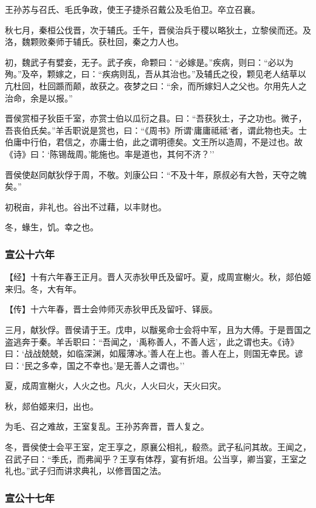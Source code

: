 \documentclass[]{article}
\begin{document}
王孙苏与召氏、毛氏争政，使王子捷杀召戴公及毛伯卫。卒立召襄。

秋七月，秦桓公伐晋，次于辅氏。壬午，晋侯治兵于稷以略狄土，立黎侯而还。及洛，魏颗败秦师于辅氏。获杜回，秦之力人也。

初，魏武子有嬖妾，无子。武子疾，命颗曰：``必嫁是。''疾病，则曰：``必以为殉。''及卒，颗嫁之，曰：``疾病则乱，吾从其治也。''及辅氏之役，颗见老人结草以亢杜回，杜回踬而颠，故获之。夜梦之曰：``余，而所嫁妇人之父也。尔用先人之治命，余是以报。''

晋侯赏桓子狄臣千室，亦赏士伯以瓜衍之县。曰：``吾获狄土，子之功也。微子，吾丧伯氏矣。''羊舌职说是赏也，曰：``《周书》所谓`庸庸祗祗'者，谓此物也夫。士伯庸中行伯，君信之，亦庸士伯，此之谓明德矣。文王所以造周，不是过也。故《诗》曰：`陈锡哉周。'能施也。率是道也，其何不济？''

晋侯使赵同献狄俘于周，不敬。刘康公曰：``不及十年，原叔必有大咎，天夺之魄矣。''

初税亩，非礼也。谷出不过藉，以丰财也。

冬，蝝生，饥。幸之也。

\hypertarget{header-n1481}{%
\subsubsection{宣公十六年}\label{header-n1481}}

【经】十有六年春王正月。晋人灭赤狄甲氏及留吁。夏，成周宣榭火。秋，郯伯姬来归。冬，大有年。

【传】十六年春，晋士会帅师灭赤狄甲氏及留吁、铎辰。

三月，献狄俘。晋侯请于王。戊申，以黻冕命士会将中军，且为大傅。于是晋国之盗逃奔于秦。羊舌职曰：``吾闻之，`禹称善人，不善人远'，此之谓也夫。《诗》曰：`战战兢兢，如临深渊，如履薄冰。'善人在上也。善人在上，则国无幸民。谚曰：`民之多幸，国之不幸也。'是无善人之谓也。''

夏，成周宣榭火，人火之也。凡火，人火曰火，天火曰灾。

秋，郯伯姬来归，出也。

为毛、召之难故，王室复乱。王孙苏奔晋，晋人复之。

冬，晋侯使士会平王室，定王享之，原襄公相礼，殽烝。武子私问其故。王闻之，召武子曰：``季氏，而弗闻乎？王享有体荐，宴有折俎。公当享，卿当宴，王室之礼也。''武子归而讲求典礼，以修晋国之法。

\hypertarget{header-n1491}{%
\subsubsection{宣公十七年}\label{header-n1491}}
\end{document}

